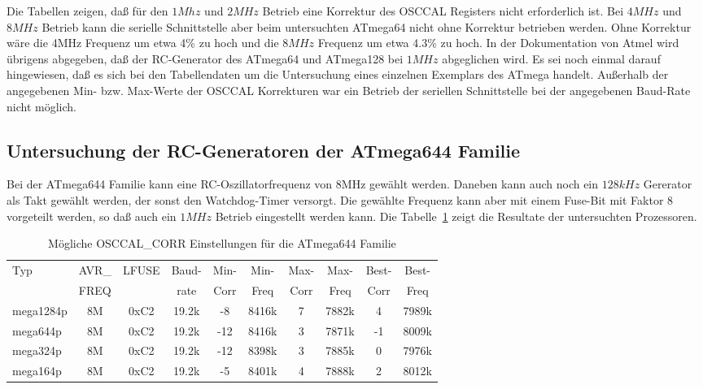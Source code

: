 Die Tabellen zeigen, daß für den \(1Mhz\) und \(2MHz\) Betrieb eine Korrektur des
OSCCAL Registers nicht erforderlich ist. Bei \(4MHz\) und \(8MHz\) Betrieb kann die serielle Schnittstelle
aber beim untersuchten ATmega64 nicht ohne Korrektur betrieben werden.
Ohne Korrektur wäre die 4MHz Frequenz um etwa 4\% zu hoch und die \(8MHz\) Frequenz um etwa 4.3\% zu hoch.
In der Dokumentation von Atmel wird übrigens abgegeben, daß der
RC-Generator des ATmega64 und ATmega128 bei \(1MHz\) abgeglichen wird.
Es sei noch einmal darauf hingewiesen, daß es sich bei den Tabellendaten um die Untersuchung eines einzelnen 
Exemplars des ATmega handelt. Außerhalb der angegebenen Min- bzw. Max-Werte der OSCCAL Korrekturen war
ein Betrieb der seriellen Schnittstelle bei der angegebenen Baud-Rate nicht möglich.

\subsection{Untersuchung der RC-Generatoren der ATmega644 Familie}

Bei der ATmega644 Familie kann  eine RC-Oszillatorfrequenz von 8MHz gewählt werden. Daneben kann
auch noch ein \(128kHz\) Gererator als Takt gewählt werden, der sonst den Watchdog-Timer versorgt.
Die gewählte Frequenz kann aber mit einem Fuse-Bit mit Faktor 8 vorgeteilt werden,
so daß auch ein \(1MHz\) Betrieb eingestellt werden kann.
Die Tabelle~\ref{tab:mega644freq} zeigt die Resultate der untersuchten Prozessoren.

\begin{table}[H]
  \begin{center}
    \begin{tabular}{| l | c | c | c || c | c || c | c || c | c |}
    \hline
   Typ  &       AVR\_ & LFUSE & Baud- & Min- & Min- & Max- & Max- & Best- & Best-  \\
        &       FREQ  &       & rate & Corr & Freq & Corr & Freq  & Corr  & Freq  \\
    \hline
    \hline
mega1284p &          8M & 0xC2  & 19.2k & -8  & 8416k & 7  & 7882k  & 4  & 7989k \\
    \hline
mega644p &          8M & 0xC2  & 19.2k &  -12 & 8416k & 3  & 7871k  & -1  & 8009k \\
    \hline
mega324p &          8M & 0xC2  & 19.2k &  -12 & 8398k & 3  & 7885k  & 0  & 7976k \\
    \hline
mega164p &          8M & 0xC2  & 19.2k &  -5  & 8401k & 4  & 7888k  & 2  & 8012k \\
    \hline
    \end{tabular}
  \end{center}
  \caption{Mögliche OSCCAL\_CORR Einstellungen für die ATmega644 Familie}
  \label{tab:mega644freq}
\end{table}

